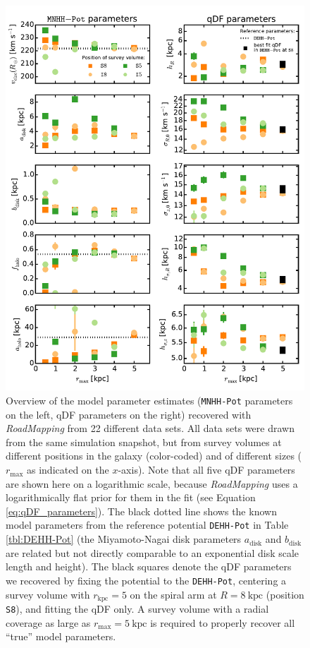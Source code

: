 \documentclass[iop,revtex4,numberedappendix,appendixfloats]{emulateapj}
\newcommand{\RM}{{\sl RoadMapping}}
\begin{document}
\begin{figure}[!htbp]
\centering
\includegraphics[width=\columnwidth]{fig/MNdHHdiffSph2_violins_3.pdf}
\caption{Overview of the model parameter estimates (\texttt{MNHH-Pot} parameters on the left, qDF parameters on the right) recovered with \RM{} from 22 different data sets. All data sets were drawn from the same simulation snapshot, but from survey volumes at different positions in the galaxy (color-coded) and of different sizes ($r_\text{max}$ as indicated on the $x$-axis). Note that all five qDF parameters are shown here on a logarithmic scale, because \RM{} uses a logarithmically flat prior for them in the fit (see Equation \eqref{eq:qDF_parameters}). The black dotted line shows the known model parameters from the reference potential \texttt{DEHH-Pot} in Table \ref{tbl:DEHH-Pot} (the Miyamoto-Nagai disk parameters $a_\text{disk}$ and $b_\text{disk}$ are related but not directly comparable to an exponential disk scale length and height). The black squares denote the qDF parameters we recovered by fixing the potential to the \texttt{DEHH-Pot}, centering a survey volume with $r_\text{kpc}=5$ on the spiral arm at $R=8~\text{kpc}$ (position \texttt{S8}), and fitting the qDF only. A survey volume with a radial coverage as large as $r_\text{max}=5~\text{kpc}$ is required to properly recover all ``true'' model parameters.}
\label{fig:model_parameters}
\end{figure}
\end{document}
